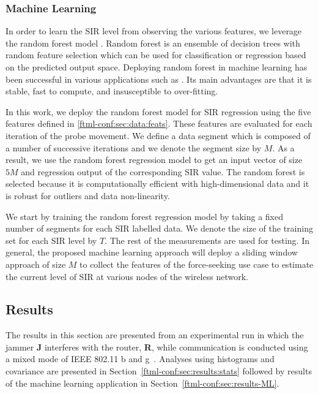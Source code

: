 \subsubsection{Machine Learning}\label{ftml-conf:sec:data:ML}
In order to learn the SIR level from observing the various features, we leverage the random forest model \cite{RF}. Random forest is an ensemble of decision trees with random feature selection which can be used for classification or regression based on the predicted output space. Deploying random forest in machine learning has been successful in various applications such as \cite{RF_1,RF_2,RF_3}. Its main advantages are that it is stable, fast to compute, and insusceptible to over-fitting.

In this work, we deploy the random forest model for SIR regression using the five features defined in \ref{ftml-conf:sec:data:feats}. These features are evaluated for each iteration of the probe movement. We define a data segment which is composed of a number of successive iterations and we denote the segment size by $M$. As a result, we use the random forest regression model to get an input vector of size $5M$ and regression output of the corresponding SIR value. The random forest is selected because it is computationally efficient with high-dimensional data and it is robust for outliers and data non-linearity. 

We start by training the random forest regression model by taking a fixed number of segments for each SIR labelled data. We denote the size of the training set for each SIR level by $T$. The rest of the measurements are used for testing. In general, the proposed machine learning approach will deploy a sliding window approach of size $M$ to collect the features of the force-seeking use case to estimate the current level of SIR at various nodes of the wireless network. 

\subsection{Results} \label{ftml-conf:sec:results}  

The results in this section are  presented from an experimental run in which the jammer \textbf{J} interferes with the router, \textbf{R}, while communication is conducted using a mixed mode of IEEE 802.11 b and g~\cite{IEEE802.11ac}.  Analyses using histograms and covariance are presented in Section~\ref{ftml-conf:sec:results:stats} followed by results of the machine learning application in Section~\ref{ftml-conf:sec:results-ML}.

